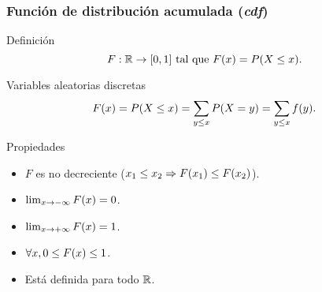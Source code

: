 \documentclass[table]{beamer}
\begin{document}
\begin{frame}
    \frametitle{Función de distribución acumulada (\emph{cdf})}
    \begin{block}{Definición}
        \begin{equation*}
            F : \reals \rightarrow \sparens{0, 1} \text{ tal que }
            \FF{x} = \prob{X \leq x} .
        \end{equation*}
    \end{block}
    \begin{block}{Variables aleatorias discretas}
        \begin{equation*}
            \FF{x} = \prob{X \leq x} = \sum_{y \leq x} \prob{X = y} = \sum_{y \leq x} \ff{y} .
        \end{equation*}
    \end{block}
    \begin{block}{Propiedades}
        \begin{itemize}
            \item $F$ es no decreciente ($x_{1} \leq x_{2} \Rightarrow \FF{x_{1}} \leq \FF{x_{2}}$).
            \item $\lim_{x \rightarrow - \infty} \FF{x} = 0$.
            \item $\lim_{x \rightarrow + \infty} \FF{x} = 1$.
            \item $\forall x , 0 \leq \FF{x} \leq 1$.
            \item Está definida para todo $\mathbb{R}$.
        \end{itemize}
    \end{block}
\end{frame}
\end{document}
